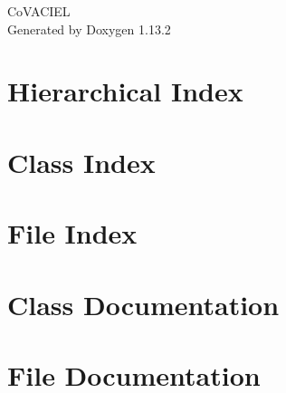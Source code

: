\documentclass[twoside]{book}
\newcommand{\+}{\discretionary{\mbox{\scriptsize$\hookleftarrow$}}{}{}}
\newcommand{\clearemptydoublepage}{%
    \newpage{\pagestyle{empty}\cleardoublepage}%
  }
\begin{document}
  \raggedbottom
    \hypersetup{pageanchor=false,
                bookmarksnumbered=true,
                pdfencoding=unicode
               }
  \begin{titlepage}
  \vspace*{7cm}
  \begin{center}%
  {\Large Co\+VACIEL}\\
  \vspace*{1cm}
  {\large Generated by Doxygen 1.13.2}\\
  \end{center}
  \end{titlepage}
  \clearemptydoublepage
  \tableofcontents
  \clearemptydoublepage
  \hypersetup{pageanchor=true}
\chapter{Hierarchical Index}

\chapter{Class Index}

\chapter{File Index}

\chapter{Class Documentation}



















\chapter{File Documentation}





  \backmatter
  \newpage
  \clearemptydoublepage
  \printindex
\end{document}

